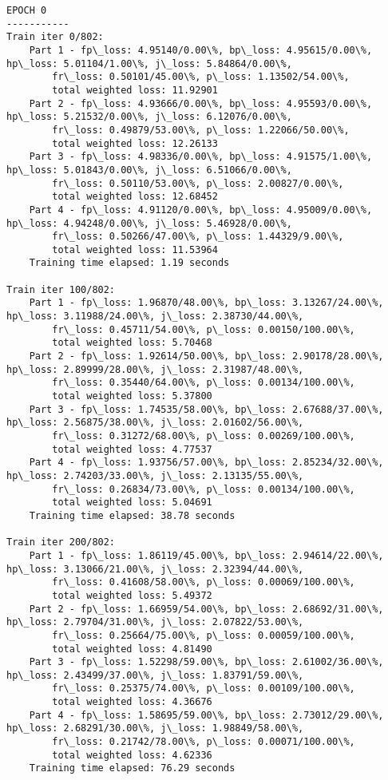 \documentclass[11pt]{article}
\begin{document}
    \begin{Verbatim}[commandchars=\\\{\}]
EPOCH 0
-----------
Train iter 0/802:
	Part 1 - fp\_loss: 4.95140/0.00\%, bp\_loss: 4.95615/0.00\%, hp\_loss: 5.01104/1.00\%, j\_loss: 5.84864/0.00\%, 
		fr\_loss: 0.50101/45.00\%, p\_loss: 1.13502/54.00\%, 
		total weighted loss: 11.92901
	Part 2 - fp\_loss: 4.93666/0.00\%, bp\_loss: 4.95593/0.00\%, hp\_loss: 5.21532/0.00\%, j\_loss: 6.12076/0.00\%, 
		fr\_loss: 0.49879/53.00\%, p\_loss: 1.22066/50.00\%, 
		total weighted loss: 12.26133
	Part 3 - fp\_loss: 4.98336/0.00\%, bp\_loss: 4.91575/1.00\%, hp\_loss: 5.01843/0.00\%, j\_loss: 6.51066/0.00\%, 
		fr\_loss: 0.50110/53.00\%, p\_loss: 2.00827/0.00\%, 
		total weighted loss: 12.68452
	Part 4 - fp\_loss: 4.91120/0.00\%, bp\_loss: 4.95009/0.00\%, hp\_loss: 4.94248/0.00\%, j\_loss: 5.46928/0.00\%, 
		fr\_loss: 0.50266/47.00\%, p\_loss: 1.44329/9.00\%, 
		total weighted loss: 11.53964
	Training time elapsed: 1.19 seconds

Train iter 100/802:
	Part 1 - fp\_loss: 1.96870/48.00\%, bp\_loss: 3.13267/24.00\%, hp\_loss: 3.11988/24.00\%, j\_loss: 2.38730/44.00\%, 
		fr\_loss: 0.45711/54.00\%, p\_loss: 0.00150/100.00\%, 
		total weighted loss: 5.70468
	Part 2 - fp\_loss: 1.92614/50.00\%, bp\_loss: 2.90178/28.00\%, hp\_loss: 2.89999/28.00\%, j\_loss: 2.31987/48.00\%, 
		fr\_loss: 0.35440/64.00\%, p\_loss: 0.00134/100.00\%, 
		total weighted loss: 5.37800
	Part 3 - fp\_loss: 1.74535/58.00\%, bp\_loss: 2.67688/37.00\%, hp\_loss: 2.56875/38.00\%, j\_loss: 2.01602/56.00\%, 
		fr\_loss: 0.31272/68.00\%, p\_loss: 0.00269/100.00\%, 
		total weighted loss: 4.77537
	Part 4 - fp\_loss: 1.93756/57.00\%, bp\_loss: 2.85234/32.00\%, hp\_loss: 2.74203/33.00\%, j\_loss: 2.13135/55.00\%, 
		fr\_loss: 0.26834/73.00\%, p\_loss: 0.00134/100.00\%, 
		total weighted loss: 5.04691
	Training time elapsed: 38.78 seconds

Train iter 200/802:
	Part 1 - fp\_loss: 1.86119/45.00\%, bp\_loss: 2.94614/22.00\%, hp\_loss: 3.13066/21.00\%, j\_loss: 2.32394/44.00\%, 
		fr\_loss: 0.41608/58.00\%, p\_loss: 0.00069/100.00\%, 
		total weighted loss: 5.49372
	Part 2 - fp\_loss: 1.66959/54.00\%, bp\_loss: 2.68692/31.00\%, hp\_loss: 2.79704/31.00\%, j\_loss: 2.07822/53.00\%, 
		fr\_loss: 0.25664/75.00\%, p\_loss: 0.00059/100.00\%, 
		total weighted loss: 4.81490
	Part 3 - fp\_loss: 1.52298/59.00\%, bp\_loss: 2.61002/36.00\%, hp\_loss: 2.43499/37.00\%, j\_loss: 1.83791/59.00\%, 
		fr\_loss: 0.25375/74.00\%, p\_loss: 0.00109/100.00\%, 
		total weighted loss: 4.36676
	Part 4 - fp\_loss: 1.58695/59.00\%, bp\_loss: 2.73012/29.00\%, hp\_loss: 2.68291/30.00\%, j\_loss: 1.98849/58.00\%, 
		fr\_loss: 0.21742/78.00\%, p\_loss: 0.00071/100.00\%, 
		total weighted loss: 4.62336
	Training time elapsed: 76.29 seconds


\end{Verbatim}
\end{document}
